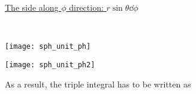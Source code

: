 \documentclass[class=article, crop=false, 12pt]{standalone}
\begin{document}
\begin{center}
    \begin{minipage}{\textwidth}
        \ul{The side along $\phi$ direction: $r\sin{\theta}\dd{\phi}$}
    \end{minipage}
    \hfill\\[1em]
    \begin{minipage}{0.35\textwidth}
        \centering
        \texttt{[image: sph\_unit\_ph]}
    \end{minipage}
    \begin{minipage}{0.35\textwidth}
        \centering
        \texttt{[image: sph\_unit\_ph2]}
    \end{minipage}
    \begin{minipage}{0.28\textwidth}
        \centering
    \end{minipage}
\end{center}


As a result, the triple integral has to be written as

\\
\end{document}
